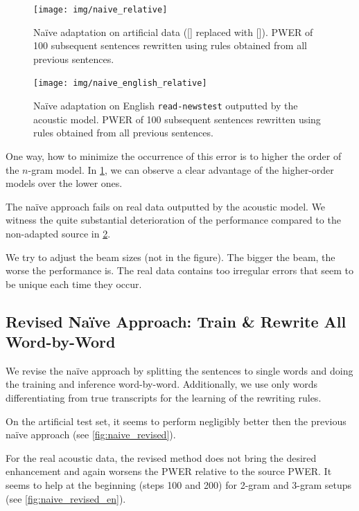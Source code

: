 \begin{figure}[h]
    \texttt{[image: img/naive\_relative]}
    \caption[Na\"ive adaptation on artificial data ]{Na\"ive adaptation on artificial data ([] replaced with []). PWER of 100 subsequent sentences rewritten using rules obtained from all previous sentences.}
    \label{fig:naive} 
\end{figure}

\begin{figure}[h]
    \texttt{[image: img/naive\_english\_relative]}
    \caption[Na\"ive adaptation on English]{Na\"ive adaptation on English \texttt{read-newstest} outputted by the acoustic model. PWER of 100 subsequent sentences rewritten using rules obtained from all previous sentences.}
    \label{fig:naive_en} 
\end{figure}

One way, how to minimize the occurrence of this error is to higher the order of the $n$-gram model. In \cref{fig:naive}, we can observe a clear advantage of the higher-order models over the lower ones.

The na\"ive approach fails on real data outputted by the acoustic model. We witness the quite substantial deterioration of the performance compared to the non-adapted source in \cref{fig:naive_en}. 

We try to adjust the beam sizes (not in the figure). The bigger the beam, the worse the performance is. The real data contains too irregular errors that seem to be unique each time they occur.

\subsection[Revised Na\"ive Approach: Train \& Rewrite All Word-by-Word]{Revised Na\"ive Approach: Train \& Rewrite All \\Word-by-Word}
We revise the na\"ive approach by splitting the sentences to single words and doing the training and inference word-by-word. Additionally, we use only words differentiating from true transcripts for the learning of the rewriting rules. 

On the artificial test set, it seems to perform negligibly better then the previous na\"ive approach (see \cref{fig:naive_revised}).

For the real acoustic data, the revised method does not bring the desired enhancement and again worsens the PWER relative to the source PWER. It seems to help at the beginning (steps 100 and 200) for 2-gram and 3-gram setups (see \cref{fig:naive_revised_en}). 

